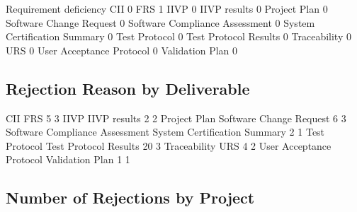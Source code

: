 \documentclass{article}
\begin{document}
\begin{Schunk}
\begin{Soutput}
                                 Requirement deficiency
  CII                                                 0
  FRS                                                 1
  IIVP                                                0
  IIVP results                                        0
  Project Plan                                        0
  Software Change Request                             0
  Software Compliance Assessment                      0
  System Certification Summary                        0
  Test Protocol                                       0
  Test Protocol Results                               0
  Traceability                                        0
  URS                                                 0
  User Acceptance Protocol                            0
  Validation Plan                                     0
\end{Soutput}
\end{Schunk}


\subsection{Rejection Reason by Deliverable}

\begin{Schunk}
\begin{Soutput}
                           CII                            FRS 
                             5                              3 
                          IIVP                   IIVP results 
                             2                              2 
                  Project Plan        Software Change Request 
                             6                              3 
Software Compliance Assessment   System Certification Summary 
                             2                              1 
                 Test Protocol          Test Protocol Results 
                            20                              3 
                  Traceability                            URS 
                             4                              2 
      User Acceptance Protocol                Validation Plan 
                             1                              1 
\end{Soutput}
\end{Schunk}

\subsection{Number of Rejections by Project}
\end{document}
